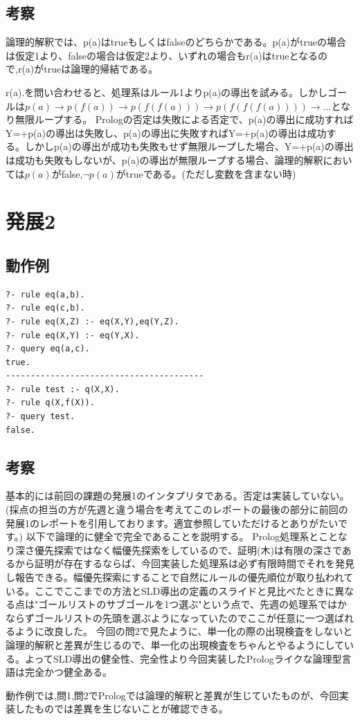 \documentclass[11pt,a4paper]{jsarticle}
\begin{document}
\subsection*{考察}
論理的解釈では、p(a)はtrueもしくはfalseのどちらかである。p(a)がtrueの場合は仮定1より、falseの場合は仮定2より、いずれの場合もr(a)はtrueとなるので,r(a)がtrueは論理的帰結である。\par
r(a).を問い合わせると、処理系はルール1よりp(a)の導出を試みる。しかしゴールは$p(a)\rightarrow p(f(a)) \rightarrow p(f(f(a))) \rightarrow p(f(f(f(a)))) \rightarrow ...$となり無限ループする。
Prologの否定は失敗による否定で、p(a)の導出に成功すればY\llap=+p(a)の導出は失敗し、p(a)の導出に失敗すればY\llap=+p(a)の導出は成功する。しかしp(a)の導出が成功も失敗もせず無限ループした場合、Y\llap=+p(a)の導出は成功も失敗もしないが、p(a)の導出が無限ループする場合、論理的解釈においては$p(a)$がfalse,$\lnot p(a)$がtrueである。(ただし変数を含まない時)
\section*{発展2}
\subsection*{動作例}
\begin{lstlisting}[basicstyle=\ttfamily\footnotesize, frame=single]
?- rule eq(a,b).
?- rule eq(c,b).
?- rule eq(X,Z) :- eq(X,Y),eq(Y,Z).
?- rule eq(X,Y) :- eq(Y,X).
?- query eq(a,c).
true.
----------------------------------------
?- rule test :- q(X,X).
?- rule q(X,f(X)).
?- query test.
false.
\end{lstlisting}
\subsection*{考察}
基本的には前回の課題の発展1のインタプリタである。否定は実装していない。(採点の担当の方が先週と違う場合を考えてこのレポートの最後の部分に前回の発展1のレポートを引用しております。適宜参照していただけるとありがたいです。)
以下で論理的に健全で完全であることを説明する。
Prolog処理系とことなり深さ優先探索ではなく幅優先探索をしているので、証明(木)は有限の深さであるから証明が存在するならば、今回実装した処理系は必ず有限時間でそれを発見し報告できる。幅優先探索にすることで自然にルールの優先順位が取り払われている。ここでここまでの方法とSLD導出の定義のスライドと見比べたときに異なる点は"ゴールリストのサブゴールを1つ選ぶ"という点で、先週の処理系ではかならずゴールリストの先頭を選ぶようになっていたのでここが任意に一つ選ばれるように改良した。
今回の問2で見たように、単一化の際の出現検査をしないと論理的解釈と差異が生じるので、単一化の出現検査をちゃんとやるようにしている。よってSLD導出の健全性、完全性より今回実装したPrologライクな論理型言語は完全かつ健全ある。\par
動作例では,問1,問2でPrologでは論理的解釈と差異が生じていたものが、今回実装したものでは差異を生じないことが確認できる。
\newpage
\hrulefill
\end{document}
